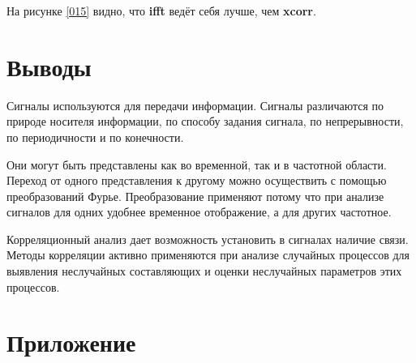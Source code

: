 \documentclass[a4paper,14pt]{extarticle}
\begin{document}
На рисунке \ref{015}  видно, что \textbf{ifft} ведёт себя лучше, чем \textbf{xcorr}.

\section{Выводы}

Сигналы используются для передачи информации. Сигналы 
различаются по природе носителя информации, по способу 
задания сигнала, по непрерывности, по периодичности и по 
конечности.

Они могут быть представлены как во временной, так и в 
частотной области. Переход от одного представления к другому 
можно осуществить с помощью преобразований Фурье. Преобразование применяют потому что при анализе сигналов для одних удобнее временное отображение, а для других частотное.

Корреляционный анализ дает возможность установить в сигналах наличие связи. Методы корреляции активно применяются при анализе случайных процессов для выявления неслучайных составляющих и оценки неслучайных параметров этих процессов.

\newpage

\section{Приложение}



\newpage



\newpage


\end{document}
